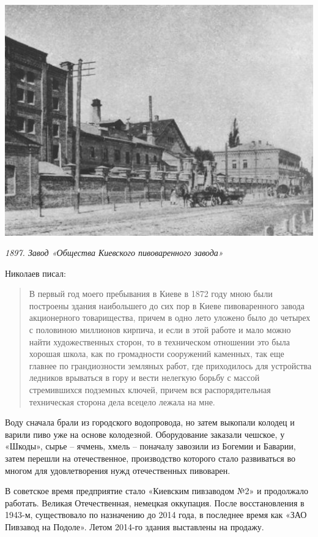 \begin{center}
\includegraphics[width=0.95\linewidth]{chast-kirvys/lys02/1897-pivzavod-tov.jpg}

\textit{1897. Завод «Общества Киевского пивоваренного завода»}
\end{center}

Николаев писал:

\begin{quotation}
В первый год моего пребывания в Киеве в 1872 году мною были построены здания наибольшего до сих пор в Киеве пивоваренного завода акционерного товарищества, причем в одно лето уложено было до четырех с половиною миллионов кирпича, и если в этой работе и мало можно найти художественных сторон, то в техническом отношении это была хорошая школа, как по громадности сооружений каменных, так еще главнее по грандиозности земляных работ, где приходилось для устройства ледников врываться в гору и вести нелегкую борьбу с массой стремившихся подземных ключей, причем вся распорядительная техническая сторона дела всецело лежала на мне. 
\end{quotation}

Воду сначала брали из городского водопровода, но затем выкопали колодец и варили пиво уже на основе колодезной. Оборудование заказали чешское, у «Шкоды», сырье – ячмень, хмель – поначалу завозили из Богемии и Баварии, затем перешли на отечественное, производство которого стало развиваться во многом для удовлетворения нужд отечественных пивоварен.

В советское время предприятие стало «Киевским пивзаводом №2» и продолжало работать. Великая Отечественная, немецкая оккупация. После восстановления в 1943-м, существовало по назначению до 2014 года, в последнее время как «ЗАО Пивзавод на Подоле». Летом 2014-го здания выставлены на продажу.


